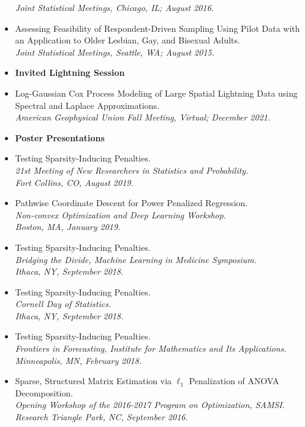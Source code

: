 \documentclass[11pt]{article}
\newcommand{\tab}{\hspace*{2em}}
\begin{document}
\begin{itemize}
	\tab \emph{Joint Statistical Meetings, Chicago, IL; August 2016.} \vspace{-2mm}
	\item[] Assessing Feasibility of Respondent-Driven Sampling Using Pilot Data with an Application to Older Lesbian, Gay, and Bisexual Adults. \\
	\tab \emph{Joint Statistical Meetings, Seattle, WA; August 2015.}  \vspace{-2mm}
	\item[] \textbf{Invited Lightning Session}\vspace{-2mm}
	\item[] Log-Gaussian Cox Process Modeling of Large Spatial Lightning Data using Spectral and Laplace Approximations. \\
	\tab \emph{American Geophysical Union Fall Meeting, Virtual; December 2021.}\vspace{-2mm}
	\item[] \textbf{Poster Presentations}\vspace{-2mm}
	\item[] Testing Sparsity-Inducing Penalties. \\
	\tab \emph{21st Meeting of New Researchers in 
Statistics and Probability.}\\ 
	\tab \emph{Fort Collins, CO, August 2019.} \vspace{-2mm}
	\item[] Pathwise Coordinate Descent for Power Penalized Regression. \\
	\tab \emph{Non-convex Optimization and Deep Learning Workshop.}\\ 
	\tab \emph{Boston, MA, January 2019.} \vspace{-2mm}
	\item[] Testing Sparsity-Inducing Penalties. \\
	\tab \emph{Bridging the Divide, Machine Learning in Medicine Symposium.}\\ 
	\tab \emph{Ithaca, NY, September 2018.} \vspace{-2mm}
	\item[] Testing Sparsity-Inducing Penalties. \\
	\tab \emph{Cornell Day of Statistics.}\\ 
	\tab \emph{Ithaca, NY, September 2018.} \vspace{-2mm}
	\item[] Testing Sparsity-Inducing Penalties. \\
	\tab \emph{Frontiers in Forecasting, Institute for Mathematics and Its Applications.}\\ 
	\tab \emph{Minneapolis, MN, February 2018.} \vspace{-2mm}
	\item[] Sparse, Structured Matrix Estimation via $\ell_1$ Penalization of ANOVA Decomposition. \\
	\tab \emph{Opening Workshop of the 2016-2017 Program on Optimization, SAMSI.}\\ 
	\tab \emph{Research Triangle Park, NC, September 2016.}
\end{itemize}
\end{document}
